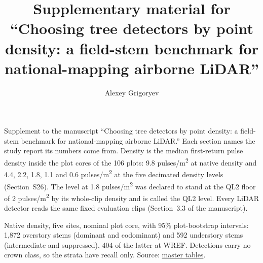 \documentclass[10pt,a4paper]{article}
\title{Supplementary material for ``Choosing tree detectors by point density:
a field-stem benchmark for national-mapping airborne LiDAR''}
\author{Alexey Grigoryev}
\date{}
\makeatletter
\newcommand\suppFloatBarrier{\par\addpenalty\z@
  \ifx\@deferlist\@empty\else\expandafter\supp@flush\fi}
\newcommand\supp@flush{\let\supp@waiting\@deferlist
  \newpage
  \ifx\@deferlist\supp@waiting\null\newpage\fi
  \ifx\@deferlist\supp@waiting\expandafter\clearpage\else\expandafter\suppFloatBarrier\fi}
\gdef\supp@afterheading{}
\renewcommand\section{\suppFloatBarrier
    \gdef\supp@afterheading{\suppressfloats[t]\gdef\supp@afterheading{}}\supp@section}}
\makeatother
\begin{document}
\maketitle

Supplement to the manuscript ``Choosing tree detectors by point density: a field-stem benchmark for national-mapping airborne LiDAR.'' Each section names the study report its numbers come
from. Density is the median first-return pulse density inside the plot cores of
the 106 plots: 9.8 pulses/m\textsuperscript{2} at native density and 4.4, 2.2, 1.8, 1.1 and 0.6
pulses/m\textsuperscript{2} at the five decimated density levels (Section~S26). The level at 1.8
pulses/m\textsuperscript{2} was declared to stand at the QL2 floor of 2 pulses/m\textsuperscript{2} by its
whole-clip density and is called the QL2 level. Every LiDAR detector reads the
same fixed evaluation clips (Section~3.3 of the manuscript).

\section*{S1. Recall by crown class}

Native density, five sites, nominal plot core, with 95\% plot-bootstrap
intervals: 1,872 overstory stems (dominant and codominant) and 592 understory
stems (intermediate and suppressed), 404 of the latter at WREF. Detections carry
no crown class, so the strata have recall only. Source: \href{https://github.com/devakellc/lidar-tree-benchmark/blob/main/results/master-tables-results.md}{master
tables}.
\end{document}
